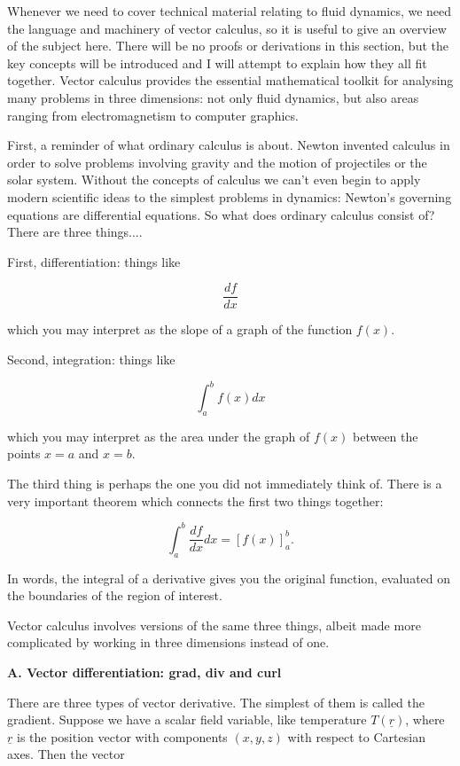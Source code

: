   Whenever we need to cover technical material relating to fluid dynamics, we 
  need the language and machinery of vector calculus, so it is useful to give 
  an overview of the subject here. There will be no proofs or derivations in 
  this section, but the key concepts will be introduced and I will attempt to 
  explain how they all fit together. Vector calculus provides the essential 
  mathematical toolkit for analysing many problems in three dimensions: not 
  only fluid dynamics, but also areas ranging from electromagnetism to computer 
  graphics. 

  First, a reminder of what ordinary calculus is about. Newton invented 
  calculus in order to solve problems involving gravity and the motion of 
  projectiles or the solar system. Without the concepts of calculus we can't 
  even begin to apply modern scientific ideas to the simplest problems in 
  dynamics: Newton's governing equations are differential equations. So what 
  does ordinary calculus consist of? There are three things.... 

  First, differentiation: things like 

  $$\dfrac{df}{dx}$$ 

  which you may interpret as the slope of a graph of the function $f(x)$. 

  Second, integration: things like 

  $$\int_a^b{f(x) dx}$$ 

  which you may interpret as the area under the graph of $f(x)$ between the 
  points $x=a$ and $x=b$. 

  The third thing is perhaps the one you did not immediately think of. There is 
  a very important theorem which connects the first two things together: 

  $$\int_a^b{\dfrac{df}{dx} dx} = [f(x)]_a^b . \tag{1}$$ 

  In words, the integral of a derivative gives you the original function, 
  evaluated on the boundaries of the region of interest. 

  Vector calculus involves versions of the same three things, albeit made more 
  complicated by working in three dimensions instead of one. 

  \textbf{A. Vector differentiation: grad, div and curl} 

  There are three types of vector derivative. The simplest of them is called 
  the gradient. Suppose we have a scalar field variable, like temperature 
  $T(\underline{r})$, where $\underline{r}$ is the position vector with 
  components $(x,y,z)$ with respect to Cartesian axes. Then the vector 

